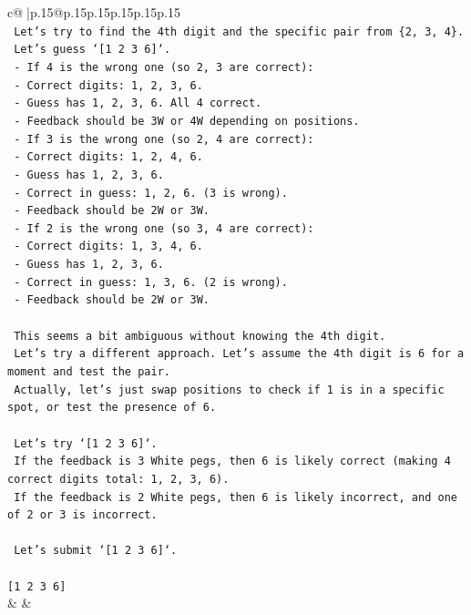 \documentclass{article}
\begin{document}
{\begin{supertabular}{c@{$\;$}|p{.15\linewidth}@{}p{.15\linewidth}p{.15\linewidth}p{.15\linewidth}p{.15\linewidth}p{.15\linewidth}}
{{{\\ 
\texttt{    Let's try to find the 4th digit and the specific pair from \{2, 3, 4\}.} \\
\texttt{    Let's guess `{[}1 2 3 6{]}`.} \\
\texttt{    {-} If 4 is the wrong one (so 2, 3 are correct):} \\
\texttt{        {-} Correct digits: 1, 2, 3, 6.} \\
\texttt{        {-} Guess has 1, 2, 3, 6. All 4 correct.} \\
\texttt{        {-} Feedback should be 3W or 4W depending on positions.} \\
\texttt{    {-} If 3 is the wrong one (so 2, 4 are correct):} \\
\texttt{        {-} Correct digits: 1, 2, 4, 6.} \\
\texttt{        {-} Guess has 1, 2, 3, 6.} \\
\texttt{        {-} Correct in guess: 1, 2, 6. (3 is wrong).} \\
\texttt{        {-} Feedback should be 2W or 3W.} \\
\texttt{    {-} If 2 is the wrong one (so 3, 4 are correct):} \\
\texttt{        {-} Correct digits: 1, 3, 4, 6.} \\
\texttt{        {-} Guess has 1, 2, 3, 6.} \\
\texttt{        {-} Correct in guess: 1, 3, 6. (2 is wrong).} \\
\texttt{        {-} Feedback should be 2W or 3W.} \\
\\ 
\texttt{    This seems a bit ambiguous without knowing the 4th digit.} \\
\texttt{    Let's try a different approach. Let's assume the 4th digit is 6 for a moment and test the pair.} \\
\texttt{    Actually, let's just swap positions to check if 1 is in a specific spot, or test the presence of 6.} \\
\\ 
\texttt{    Let's try `{[}1 2 3 6{]}`.} \\
\texttt{    If the feedback is 3 White pegs, then 6 is likely correct (making 4 correct digits total: 1, 2, 3, 6).} \\
\texttt{    If the feedback is 2 White pegs, then 6 is likely incorrect, and one of 2 or 3 is incorrect.} \\
\\ 
\texttt{    Let's submit `{[}1 2 3 6{]}`.} \\
\\ 
\texttt{{[}1 2 3 6{]}} \\
            }
        }
    }
    & & \\ \\


\end{supertabular}}
\end{document}
